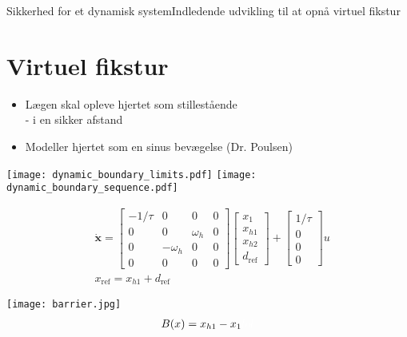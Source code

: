 \begin{frame}{Sikkerhed for et dynamisk system}{Indledende udvikling til at opnå virtuel fikstur}
\section{Virtuel fikstur}
\vspace*{-0.2cm}
\begin{block}{}
	\begin{itemize}
		\item Lægen skal opleve hjertet som stillestående \\
		\scriptsize - i en sikker afstand
		\item \normalsize Modeller hjertet som en sinus bevægelse (Dr. Poulsen)
	\end{itemize}
\end{block}
\texttt{[image: dynamic\_boundary\_limits.pdf]} \hspace*{0.4cm}
\texttt{[image: dynamic\_boundary\_sequence.pdf]}

\begin{minipage}{0.7\textwidth}
\scriptsize
\begin{align*}
& \dot{\textbf{x}} = \begin{bmatrix}
-1/\tau & 0 & 0 & 0 \\
0 & 0 & \omega_h & 0 \\
0 & -\omega_h & 0 & 0 \\
0 & 0 & 0 & 0
\end{bmatrix} \begin{bmatrix}
x_1 \\ x_{h1} \\ x_{h2} \\ d_\text{ref}
\end{bmatrix} + \begin{bmatrix}
1/\tau \\ 0 \\ 0 \\ 0
\end{bmatrix} u \\
& x_\text{ref} = x_{h1} + d_\text{ref}
\end{align*}
\end{minipage}
\hspace*{0.1cm}
\begin{minipage}{0.25\textwidth}
\vspace*{0.2cm}
\texttt{[image: barrier.jpg]}
\hspace*{-0.3cm}
\vspace*{-0.2cm} \scriptsize
\begin{align*}
B(x) =  x_{h1} - x_1 {\color{white}{lol}}
\end{align*}
\end{minipage}
\end{frame}

